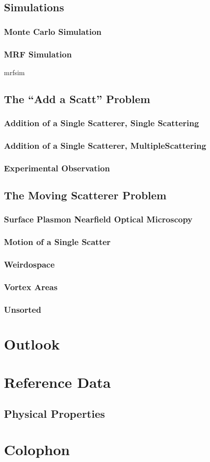 \documentclass[a4paper,titlepage,onecolumn]{report}
\begin{document}
 \section{Simulations}
  \subsection{Monte Carlo Simulation}
  \subsection{MRF Simulation} \label{sec:mrfsim}
		{mrfsim}
 \section{The ``Add a Scatt'' Problem}
  \subsection{Addition of a Single Scatterer, Single Scattering}
  \subsection{Addition of a Single Scatterer, MultipleScattering}
  \subsection{Experimental Observation}
 \section{The Moving Scatterer Problem}
  \subsection{Surface Plasmon Nearfield Optical Microscopy}
  \subsection{Motion of a Single Scatter}
  \subsection{Weirdospace}
  \subsection{Vortex Areas}
  \subsection{Unsorted}

\chapter{Outlook} \label{ch:outlook}

\chapter{Reference Data} \label{ch:reference}
\section{Physical Properties}
\label{ref:physicalproperties}
\chapter{Colophon}



\end{document}

